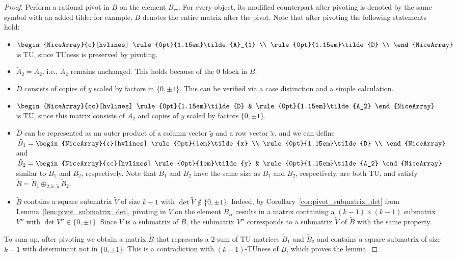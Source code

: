 \documentclass{article}
\theoremstyle{definition}
\begin{document}
\begin{proof}
    Perform a rational pivot in $B$ on the element $B_{rc}$. For every object, its modified counterpart after pivoting is denoted by the same symbol with an added tilde; for example, $\tilde{B}$ denotes the entire matrix after the pivot. Note that after pivoting the following statements hold:
    \begin{itemize}
        \item $\begin{NiceArray}{c}[hvlines] \rule{0pt}{1.15em}\tilde{A}_{1} \\ \rule{0pt}{1.15em}\tilde{D} \\ \end{NiceArray}$ is TU, since TUness is preserved by pivoting.
        \item $\tilde{A}_{2} = A_{2}$, i.e., $A_{2}$ remains unchanged. This holds because of the $0$ block in $B$.
        \item $\tilde{D}$ consists of copies of $y$ scaled by factors in $\{0, \pm 1\}$. This can be verified via a case distinction and a simple calculation.
        \item $\begin{NiceArray}{cc}[hvlines] \rule{0pt}{1.15em}\tilde{D} & \rule{0pt}{1.15em}\tilde{A_2} \end{NiceArray}$ is TU, since this matrix consists of $A_{2}$ and copies of $y$ scaled by factors $\{0, \pm 1\}$.
        \item $\tilde{D}$ can be represented as an outer product of a column vector $\tilde{y}$ and a row vector $\tilde{x}$, and we can define $\tilde{B}_{1} = \begin{NiceArray}{c}[hvlines] \rule{0pt}{1em}\tilde{x} \\ \rule{0pt}{1.15em}\tilde{D} \\ \end{NiceArray}$ and $\tilde{B}_{2} =\begin{NiceArray}{cc}[hvlines] \rule{0pt}{1em}\tilde{y} & \rule{0pt}{1.15em}\tilde{A_2} \end{NiceArray}$ similar to $B_{1}$ and $B_{2}$, respectively. Note that $\tilde{B}_{1}$ and $\tilde{B}_{2}$ have the same size as $B_{1}$ and $B_{2}$, respectively, are both TU, and satisfy $\tilde{B} = \tilde{B}_{1} \oplus_{2, \tilde{x}, \tilde{y}} \tilde{B}_{2}$.
        \item $\tilde{B}$ contains a square submatrix $\tilde{V}$ of size $k - 1$ with $\det \tilde{V} \notin \{0, \pm 1\}$. Indeed, by Corollary~\ref{cor:pivot_submatrix_det} from Lemma~\ref{lem:pivot_submatrix_det}, pivoting in $V$ on the element $B_{rc}$ results in a matrix containing a $(k - 1) \times (k - 1)$ submatrix $V''$ with $\det V'' \in \{0, \pm 1\}$. Since $V$ is a submatrix of $B$, the submatrix $V''$ corresponds to a submatrix $\tilde{V}$ of $\tilde{B}$ with the same property.
    \end{itemize}
    To sum up, after pivoting we obtain a matrix $\tilde{B}$ that represents a $2$-sum of TU matrices $\tilde{B}_{1}$ and $\tilde{B}_{2}$ and contains a square submatrix of size $k - 1$ with determinant not in $\{0, \pm 1\}$. This is a contradiction with $(k - 1)$-TUness of $\tilde{B}$, which proves the lemma.
\end{proof}
\end{document}
